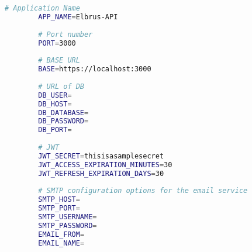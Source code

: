 \documentclass{article}
\begin{document}
	\lstset{style=files}
	\begin{lstlisting}[caption={Anhand von '.env.example' eigene '.env' Datei anlegen.}, language=bash]
		# Application Name
		APP_NAME=Elbrus-API
		
		# Port number
		PORT=3000
		
		# BASE URL
		BASE=https://localhost:3000
		
		# URL of DB
		DB_USER=
		DB_HOST=
		DB_DATABASE=
		DB_PASSWORD=
		DB_PORT=
		
		# JWT
		JWT_SECRET=thisisasamplesecret
		JWT_ACCESS_EXPIRATION_MINUTES=30
		JWT_REFRESH_EXPIRATION_DAYS=30
		
		# SMTP configuration options for the email service
		SMTP_HOST=
		SMTP_PORT=
		SMTP_USERNAME=
		SMTP_PASSWORD=
		EMAIL_FROM=
		EMAIL_NAME=
	\end{lstlisting}
	\lstset{style=commands}
\end{document}
